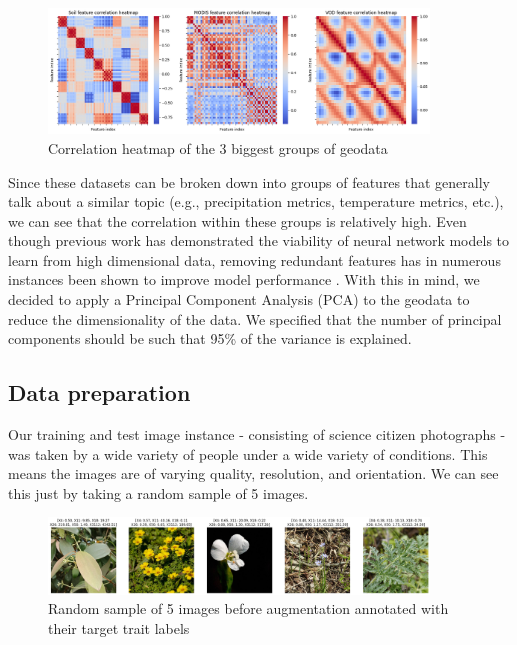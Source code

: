 \documentclass[12pt,a4paper,oneside]{article}
\begin{document}
\begin{figure}[!h]
    \centering
    \includegraphics[width=0.9\textwidth]{assets/corr_hm.png}
    \caption{Correlation heatmap of the 3 biggest groups of geodata}
\end{figure}

Since these datasets can be broken down into groups of features that generally talk about a similar topic (e.g., precipitation metrics, temperature metrics, etc.), we can see that the correlation within these groups is relatively high. Even though previous work \cite{DBLP:journals/corr/abs-2007-00062} has demonstrated the viability of neural network models to learn from high dimensional data, removing redundant features has in numerous instances been shown to improve model performance \cite{chen2022survey}. With this in mind, we decided to apply a Principal Component Analysis (PCA) to the geodata to reduce the dimensionality of the data. We specified that the number of principal components should be such that 95\% of the variance is explained.  

\subsection{Data preparation}

Our training and test image instance - consisting of science citizen photographs - was taken by a wide variety of people under a wide variety of conditions. This means the images are of varying quality, resolution, and orientation. We can see this just by taking a random sample of 5 images.
\begin{figure}[!h]
    \centering
    \includegraphics[width=0.9\textwidth]{assets/before_aug_img.png}
    \caption{Random sample of 5 images before augmentation annotated with their target trait labels}
\end{figure}
\end{document}
